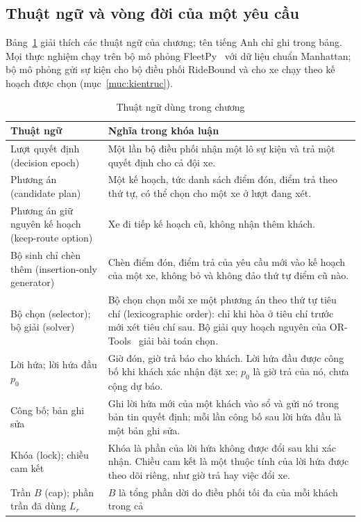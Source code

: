 \subsection{Thuật ngữ và vòng đời của một yêu cầu}
\label{muc:thuatngu}

Bảng~\ref{bang:thuatngu} giải thích các thuật ngữ của chương; tên tiếng Anh chỉ ghi trong bảng. Mọi thực
nghiệm chạy trên bộ mô phỏng FleetPy~\cite{engelhardt2026} với dữ liệu chuẩn Manhattan; bộ mô phỏng gửi sự
kiện cho bộ điều phối RideBound và cho xe chạy theo kế hoạch được chọn (mục~\ref{muc:kientruc}).

\begin{table}[htbp]
\centering
\caption{Thuật ngữ dùng trong chương}
\label{bang:thuatngu}
\small
\begin{tabular}{@{}p{4.3cm}p{10.5cm}@{}}
\toprule
\textbf{Thuật ngữ} & \textbf{Nghĩa trong khóa luận}\\
\midrule
Lượt quyết định (decision epoch) & Một lần bộ điều phối nhận một lô sự kiện và trả một quyết định cho cả
đội xe.\\
Phương án (candidate plan) & Một kế hoạch, tức danh sách điểm đón, điểm trả theo thứ tự, có thể chọn cho
một xe ở lượt đang xét.\\
Phương án giữ nguyên kế hoạch (keep-route option) & Xe đi tiếp kế hoạch cũ, không nhận thêm khách.\\
Bộ sinh chỉ chèn thêm (insertion-only generator) & Chèn điểm đón, điểm trả của yêu cầu mới vào kế hoạch
của một xe, không bỏ và không đảo thứ tự điểm cũ nào.\\
Bộ chọn (selector); bộ giải (solver) & Bộ chọn chọn mỗi xe một phương án theo thứ tự tiêu chí
(lexicographic order): chỉ khi hòa ở tiêu chí trước mới xét tiêu chí sau. Bộ giải quy hoạch nguyên của
OR-Tools~\cite{ortools} giải bài toán chọn.\\
Lời hứa; lời hứa đầu $p_0$ & Giờ đón, giờ trả báo cho khách. Lời hứa đầu được công bố khi khách xác nhận
đặt xe; $p_0$ là giờ trả của nó, chưa cộng dự báo.\\
Công bố; bản ghi sửa & Ghi lời hứa mới của một khách vào sổ và gửi nó trong bản tin quyết định; mỗi lần
công bố sau lời hứa đầu là một bản ghi sửa.\\
Khóa (lock); chiều cam kết & Khóa là phần của lời hứa không được đổi sau khi xác nhận. Chiều cam kết là một
thuộc tính của lời hứa được theo dõi riêng, như giờ trả hay việc đổi xe.\\
Trần $B$ (cap); phần trần đã dùng $L_r$ & $B$ là tổng phần dời do điều phối tối đa của mỗi khách trong cả

\end{tabular}
\end{table}
